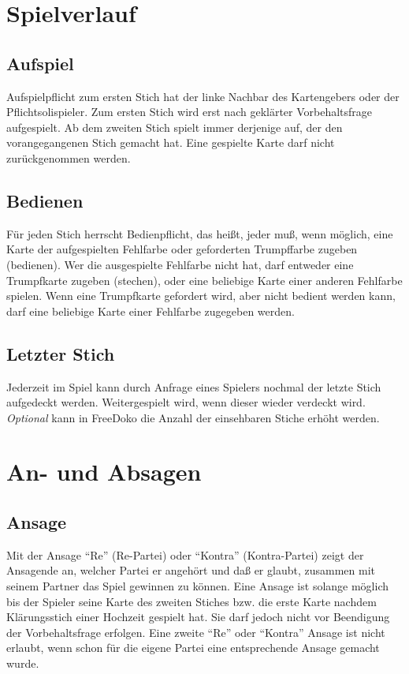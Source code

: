 \documentclass{scrartcl}
\newcommand{\Optional}{\textit{Optional}\xspace}
\begin{document}
\section{Spielverlauf}

\subsection{Aufspiel}
Aufspielpflicht zum ersten Stich hat der linke Nachbar des Kartengebers oder der Pflichtsolispieler. Zum ersten Stich wird erst nach geklärter Vorbehaltsfrage aufgespielt. Ab dem zweiten Stich spielt immer derjenige auf, der den vorangegangenen Stich gemacht hat. Eine gespielte Karte darf nicht zurückgenommen
werden.

\subsection{Bedienen}
Für jeden Stich herrscht Bedienpflicht, das heißt, jeder muß, wenn möglich, eine Karte der aufgespielten Fehlfarbe oder geforderten Trumpffarbe zugeben (bedienen). Wer die ausgespielte Fehlfarbe nicht hat, darf entweder eine Trumpfkarte zugeben (stechen), oder eine beliebige Karte einer anderen Fehlfarbe spielen. Wenn eine Trumpfkarte gefordert wird, aber nicht bedient werden kann, darf eine beliebige Karte einer Fehlfarbe zugegeben werden.

\subsection{Letzter Stich}
Jederzeit im Spiel kann durch Anfrage eines Spielers nochmal der letzte Stich aufgedeckt werden. Weitergespielt wird, wenn dieser wieder verdeckt wird.  \Optional kann in FreeDoko die Anzahl der einsehbaren Stiche erhöht werden.

\section{An- und Absagen}

\subsection{Ansage}
Mit der Ansage "`Re"' (Re-Partei) oder "`Kontra"' (Kontra-Partei) zeigt der Ansagende an, welcher Partei er angehört und daß er glaubt, zusammen mit seinem Partner das Spiel gewinnen zu können.  Eine Ansage ist solange möglich bis der Spieler seine Karte des zweiten Stiches bzw. die erste Karte nachdem Klärungsstich einer Hochzeit gespielt hat. Sie darf jedoch nicht vor Beendigung der Vorbehaltsfrage erfolgen. Eine zweite "`Re"' oder "`Kontra"' Ansage ist nicht erlaubt, wenn schon für die eigene Partei eine entsprechende Ansage gemacht wurde.
\end{document}
